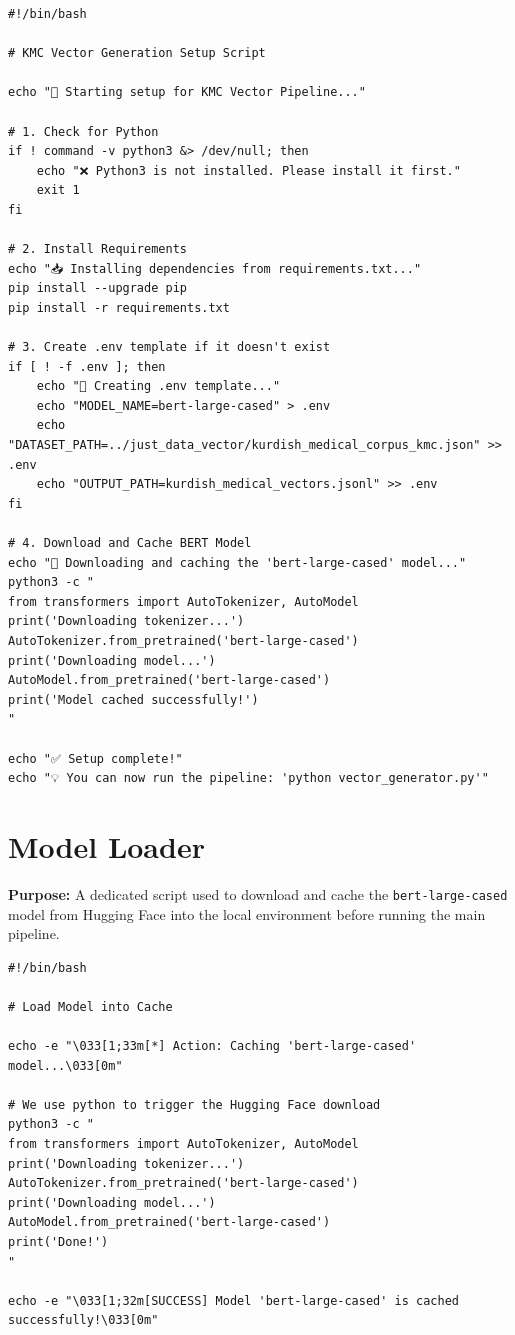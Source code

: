 \documentclass[11pt]{article}
\begin{document}
\begin{lstlisting}[style=bashcode, caption={setup.sh}]
#!/bin/bash

# KMC Vector Generation Setup Script

echo "🚀 Starting setup for KMC Vector Pipeline..."

# 1. Check for Python
if ! command -v python3 &> /dev/null; then
    echo "❌ Python3 is not installed. Please install it first."
    exit 1
fi

# 2. Install Requirements
echo "📥 Installing dependencies from requirements.txt..."
pip install --upgrade pip
pip install -r requirements.txt

# 3. Create .env template if it doesn't exist
if [ ! -f .env ]; then
    echo "📝 Creating .env template..."
    echo "MODEL_NAME=bert-large-cased" > .env
    echo "DATASET_PATH=../just_data_vector/kurdish_medical_corpus_kmc.json" >> .env
    echo "OUTPUT_PATH=kurdish_medical_vectors.jsonl" >> .env
fi

# 4. Download and Cache BERT Model
echo "🧠 Downloading and caching the 'bert-large-cased' model..."
python3 -c "
from transformers import AutoTokenizer, AutoModel
print('Downloading tokenizer...')
AutoTokenizer.from_pretrained('bert-large-cased')
print('Downloading model...')
AutoModel.from_pretrained('bert-large-cased')
print('Model cached successfully!')
"

echo "✅ Setup complete!"
echo "💡 You can now run the pipeline: 'python vector_generator.py'"
\end{lstlisting}


\section{Model Loader} \label{sec:loader}
\textbf{Purpose:} A dedicated script used to download and cache the \texttt{bert-large-cased} model from Hugging Face into the local environment before running the main pipeline.

\begin{lstlisting}[style=bashcode, caption={load\_model\_gpu\_1.sh}]
#!/bin/bash

# Load Model into Cache

echo -e "\033[1;33m[*] Action: Caching 'bert-large-cased' model...\033[0m"

# We use python to trigger the Hugging Face download
python3 -c "
from transformers import AutoTokenizer, AutoModel
print('Downloading tokenizer...')
AutoTokenizer.from_pretrained('bert-large-cased')
print('Downloading model...')
AutoModel.from_pretrained('bert-large-cased')
print('Done!')
"

echo -e "\033[1;32m[SUCCESS] Model 'bert-large-cased' is cached successfully!\033[0m"
\end{lstlisting}
\end{document}
